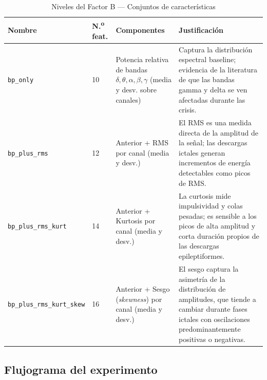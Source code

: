 \documentclass[12pt,a4paper]{article}
\begin{document}
\begin{table}[H]
\centering
\caption{Niveles del Factor B — Conjuntos de características}
\label{tab:factor_b}
\renewcommand{\arraystretch}{1.3}
\begin{tabularx}{\textwidth}{p{3.5cm} p{1.5cm} p{4cm} >{\RaggedRight\arraybackslash}X}
\toprule
\textbf{Nombre} & \textbf{N.\textsuperscript{o} feat.} & \textbf{Componentes} & \textbf{Justificación} \\
\midrule
\texttt{bp\_only} & 10 &
  Potencia relativa de bandas $\delta,\theta,\alpha,\beta,\gamma$ (media y desv. sobre canales) &
  Captura la distribución espectral baseline; evidencia de la literatura de que las
  bandas gamma y delta se ven afectadas durante las crisis. \\
\midrule
\texttt{bp\_plus\_rms} & 12 &
  Anterior + RMS por canal (media y desv.) &
  El RMS es una medida directa de la amplitud de la señal; las descargas ictales
  generan incrementos de energía detectables como picos de RMS. \\
\midrule
\texttt{bp\_plus\_rms\_kurt} & 14 &
  Anterior + Kurtosis por canal (media y desv.) &
  La curtosis mide impulsividad y colas pesadas; es sensible a los picos de alta
  amplitud y corta duración propios de las descargas epileptiformes. \\
\midrule
\texttt{bp\_plus\_rms\_kurt\_skew} & 16 &
  Anterior + Sesgo (\textit{skewness}) por canal (media y desv.) &
  El sesgo captura la asimetría de la distribución de amplitudes, que tiende a
  cambiar durante fases ictales con oscilaciones predominantemente positivas o negativas. \\
\bottomrule
\end{tabularx}
\end{table}

\subsection{Flujograma del experimento}
\end{document}
